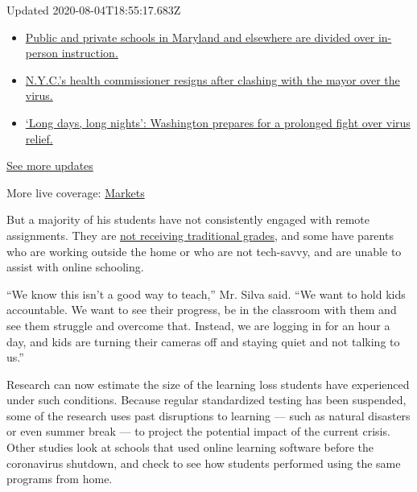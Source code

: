 Updated 2020-08-04T18:55:17.683Z

\begin{itemize}
\tightlist
\item
  \href{https://www.nytimes.com/2020/08/04/world/coronavirus-cases.html?action=click\&pgtype=Article\&state=default\&region=MAIN_CONTENT_1\&context=storylines_live_updates\#link-4825b93}{Public
  and private schools in Maryland and elsewhere are divided over
  in-person instruction.}
\item
  \href{https://www.nytimes.com/2020/08/04/world/coronavirus-cases.html?action=click\&pgtype=Article\&state=default\&region=MAIN_CONTENT_1\&context=storylines_live_updates\#link-4d1eafa8}{N.Y.C.'s
  health commissioner resigns after clashing with the mayor over the
  virus.}
\item
  \href{https://www.nytimes.com/2020/08/04/world/coronavirus-cases.html?action=click\&pgtype=Article\&state=default\&region=MAIN_CONTENT_1\&context=storylines_live_updates\#link-6b644638}{`Long
  days, long nights': Washington prepares for a prolonged fight over
  virus relief.}
\end{itemize}

\href{https://www.nytimes.com/2020/08/04/world/coronavirus-cases.html?action=click\&pgtype=Article\&state=default\&region=MAIN_CONTENT_1\&context=storylines_live_updates}{See
more updates}

More live coverage:
\href{https://www.nytimes.com/live/2020/08/04/business/stock-market-today-coronavirus?action=click\&pgtype=Article\&state=default\&region=MAIN_CONTENT_1\&context=storylines_live_updates}{Markets}

But a majority of his students have not consistently engaged with remote
assignments. They are
\href{https://www.nytimes.com/2020/04/30/us/coronavirus-high-school-grades.html}{not
receiving traditional grades}, and some have parents who are working
outside the home or who are not tech-savvy, and are unable to assist
with online schooling.

``We know this isn't a good way to teach,'' Mr. Silva said. ``We want to
hold kids accountable. We want to see their progress, be in the
classroom with them and see them struggle and overcome that. Instead, we
are logging in for an hour a day, and kids are turning their cameras off
and staying quiet and not talking to us.''

Research can now estimate the size of the learning loss students have
experienced under such conditions. Because regular standardized testing
has been suspended, some of the research uses past disruptions to
learning --- such as natural disasters or even summer break --- to
project the potential impact of the current crisis. Other studies look
at schools that used online learning software before the coronavirus
shutdown, and check to see how students performed using the same
programs from home.

